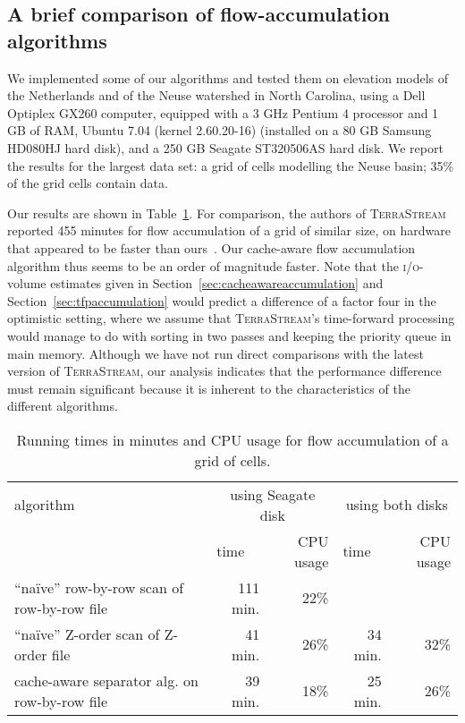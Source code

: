 \documentclass[10pt,a4paper]{article}
\def\io{\textsc{i/o}\xspace}
\def\tsm{\textsc{TerraStream}\xspace}
\begin{document}
\subsection{A brief comparison of flow-accumulation algorithms}\label{sec:evaluation}
We implemented some of our algorithms and tested them on elevation models of the Netherlands and of the Neuse watershed in North Carolina, using a Dell Optiplex GX260 computer, equipped with a 3 GHz Pentium 4 processor and 1 GB of RAM, Ubuntu 7.04 (kernel 2.60.20-16) (installed on a 80 GB Samsung HD080HJ hard disk), and a 250 GB Seagate ST320506AS hard disk. We report the results for the largest data set: a grid of  cells modelling the Neuse basin; 35\% of the grid cells contain data.

Our results are shown in Table~\ref{tab:runningtimes}. For comparison, the authors of \tsm reported 455 minutes for flow accumulation of a grid of similar size, on hardware that appeared to be faster than ours~\cite{terrastream}.
Our cache-aware flow accumulation algorithm thus seems to be an order of magnitude faster. Note that the \io-volume estimates given in Section~\ref{sec:cacheawareaccumulation} and Section~\ref{sec:tfpaccumulation} would predict a difference of a factor four in the optimistic setting, where we assume that \tsm's time-forward processing would manage to do with sorting in two passes and keeping the priority queue in main memory. Although we have not run direct comparisons with the latest version of \tsm, our analysis indicates that the performance difference must remain significant because it is inherent to the characteristics of the different algorithms.

\begin{table}
\centering{}
\begin{tabular}{|l|rr|rr|}
\hline
algorithm                      & \multicolumn{2}{c|}{using Seagate disk} & \multicolumn{2}{c|}{using both disks} \\
&  \multicolumn{1}{l}{time} & CPU usage                & \multicolumn{1}{l}{time} & CPU usage\\

\hline
``na\"ive'' row-by-row scan of row-by-row file & 111 min. & 22\% & & \\
``na\"ive'' Z-order scan of Z-order file    & 41 min. & 26\% & 34 min. & 32\% \\
cache-aware separator alg. on row-by-row file & 39 min. & 18\% & 25 min. & 26\% \\
\hline
\end{tabular}
\caption{Running times in minutes and CPU usage for flow accumulation of a grid of  cells.}
\label{tab:runningtimes}
\end{table}
\end{document}
